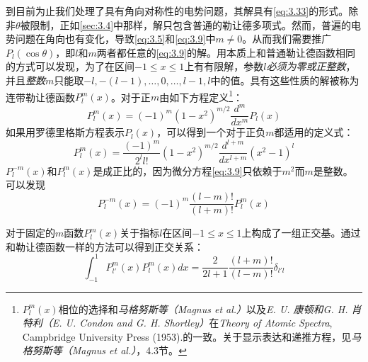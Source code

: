 \documentclass[12pt]{book}
\numberwithin{equation}{chapter}
\numberwithin{figure}{chapter}
\numberwithin{footnote}{page}
\begin{document}
到目前为止我们处理了具有角向对称性的电势问题，其解具有\autoref{eq:3.33}的形式。除非$\theta$被限制，正如\autoref{sec:3.4}中那样，解只包含普通的勒让德多项式。然而，普遍的电势问题在角向也有变化，导致\autoref{eq:3.5}和\autoref{eq:3.9}中$m\neq0$。从而我们需要推广$P_l(\cos\theta)$，即$l$和$m$两者都任意的\autoref{eq:3.9}的解。用本质上和普通勒让德函数相同的方式可以发现，为了在区间$-1\leq x\leq1$上有有限解，参数$l$\textit{必须为零或正整数}，并且\textit{整数$m$}只能取$-l,-(l-1),\dots,0,\dots,l-1,l$中的值。具有这些性质的解被称为连带勒让德函数$P_l^m(x)$。对于正$m$由如下方程定义\footnote{$P_l^m(x)$相位的选择和\textit{马格努斯等（Magnus et al.）}以及\textit{E. U. 康顿和G. H. 肖特利（E. U. Condon and G. H. Shortley）}在\textit{Theory of Atomic Spectra}, Campbridge University Press (1953).的一致。关于显示表达和递推方程，见\textit{马格努斯等（Magnus et al.）}，4.3节。}：
\begin{equation}\label{eq:3.49}
    P_l^m(x)=(-1)^m(1-x^2)^{m/2}\frac{d^m}{dx^m}P_l(x)
\end{equation}
如果用罗德里格斯方程表示$P_l(x)$，可以得到一个对于正负$m$都适用的定义式：
\begin{equation}\label{eq:3.50}
    P_l^m(x)=\frac{(-1)^m}{2^ll!}(1-x^2)^{m/2}\frac{d^{l+m}}{dx^{l+m}}(x^2-1)^l
\end{equation}
$P_l^{-m}(x)$和$P_l^m(x)$是成正比的，因为微分方程\autoref{eq:3.9}只依赖于$m^2$而$m$是整数。可以发现
\begin{equation}\label{eq:3.51}
    P_l^{-m}(x)=(-1)^m\frac{(l-m)!}{(l+m)!}P_l^m(x)
\end{equation}

对于固定的$m$函数$P_l^m(x)$关于指标$l$在区间$-1\leq x\leq 1$上构成了一组正交基。通过和勒让德函数一样的方法可以得到正交关系：
\begin{equation}\label{eq:3.52}
    \int_{-1}^{1}P_{l'}^m(x)P_l^m(x)dx=\frac{2}{2l+1}\frac{(l+m)!}{(l-m)!}\delta_{l'l}
\end{equation}
\end{document}
